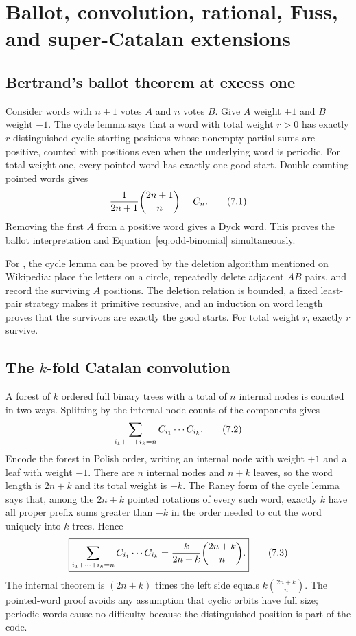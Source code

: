 \section{Ballot, convolution, rational, Fuss, and super-Catalan extensions}
\label{sec:generalizations}

\subsection{Bertrand's ballot theorem at excess one}

Consider words with $n+1$ votes $A$ and $n$ votes $B$.  Give $A$ weight $+1$
and $B$ weight $-1$.  The cycle lemma says that a word with total weight
$r>0$ has exactly $r$ distinguished cyclic starting positions whose nonempty
partial sums are positive, counted with positions even when the underlying
word is periodic.  For total weight one, every pointed word has exactly one
good start.  Double counting pointed words gives
\[
 \frac1{2n+1}\binom{2n+1}{n}=C_n.                             \tag{7.1}
\]
Removing the first $A$ from a positive word gives a Dyck word.  This proves the
ballot interpretation and Equation~\eqref{eq:odd-binomial} simultaneously.

For \ipra, the cycle lemma can be proved by the deletion algorithm mentioned
on Wikipedia: place the letters on a circle, repeatedly delete adjacent
$AB$ pairs, and record the surviving $A$ positions.  The deletion relation is
bounded, a fixed least-pair strategy makes it primitive recursive, and an
induction on word length proves that the survivors are exactly the good
starts.  For total weight $r$, exactly $r$ survive.

\subsection{The \(k\)-fold Catalan convolution}

A forest of $k$ ordered full binary trees with a total of $n$ internal nodes is
counted in two ways.  Splitting by the internal-node counts of the components
gives
\[
 \sum_{i_1+\cdots+i_k=n}C_{i_1}\cdots C_{i_k}.              \tag{7.2}
\]
Encode the forest in Polish order, writing an internal node with weight $+1$
and a leaf with weight $-1$.  There are $n$ internal nodes and $n+k$ leaves,
so the word length is $2n+k$ and its total weight is $-k$.  The Raney form of
the cycle lemma says that, among the $2n+k$ pointed rotations of every such
word, exactly $k$ have all proper prefix sums greater than $-k$ in the order
needed to cut the word uniquely into $k$ trees.  Hence
\[
 \boxed{\displaystyle
 \sum_{i_1+\cdots+i_k=n}C_{i_1}\cdots C_{i_k}
  =\frac{k}{2n+k}\binom{2n+k}{n}.}                               \tag{7.3}\label{eq:kfold}
\]
The internal theorem is
$(2n+k)$ times the left side equals $k\binom{2n+k}{n}$.
The pointed-word proof avoids any assumption that cyclic orbits have full
size; periodic words cause no difficulty because the distinguished position is
part of the code.

